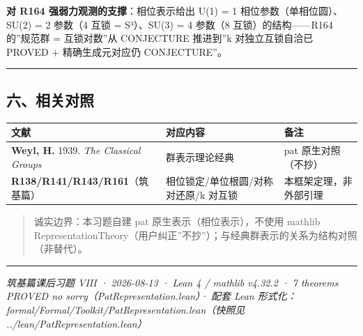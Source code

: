 \documentclass[
]{article}
\newcounter{none} %
\begin{document}
\textbf{对 R164 强弱力观测的支撑}：相位表示给出 U(1) = 1
相位参数（单相位圆）、SU(2) = 2 参数（4 互锁 = S³）、SU(3) = 4 参数（8
互锁）的结构------R164 的''规范群 = 互锁对数''从 CONJECTURE 推进到''k
对独立互锁自洽已 PROVED + 精确生成元对应仍 CONJECTURE''。

\begin{center}\rule{0.5\linewidth}{0.5pt}\end{center}

\subsection{六、相关对照}\label{ux516dux76f8ux5173ux5bf9ux7167}

{\def\LTcaptype{none} %
\begin{longtable}[]{@{}
  >{\raggedright\arraybackslash}p{}
  >{\raggedright\arraybackslash}p{}
  >{\raggedright\arraybackslash}p{}@{}}
\toprule\noalign{}
\begin{minipage}[b]{\linewidth}\raggedright
文献
\end{minipage} & \begin{minipage}[b]{\linewidth}\raggedright
对应内容
\end{minipage} & \begin{minipage}[b]{\linewidth}\raggedright
备注
\end{minipage} \\
\midrule\noalign{}
\endhead
\bottomrule\noalign{}
\endlastfoot
\textbf{Weyl, H.} 1939. \emph{The Classical Groups} & 群表示理论经典 &
pat 原生对照（不抄） \\
\textbf{R138/R141/R143/R161}（筑基篇） & 相位锁定/单位根圆/对称对还原/k
对互锁 & 本框架定理，非外部引理 \\
\end{longtable}
}

\begin{quote}
诚实边界：本习题自建 pat 原生表示（相位表示），不使用 mathlib
RepresentationTheory（用户纠正''不抄''）；与经典群表示的关系为结构对照（非替代）。
\end{quote}

\begin{center}\rule{0.5\linewidth}{0.5pt}\end{center}

\emph{筑基篇课后习题 VIII · 2026-08-13 · Lean 4 / mathlib v4.32.2 · 7
theorems PROVED no sorry（PatRepresentation.lean）· 配套 Lean
形式化：formal/Formal/Toolkit/PatRepresentation.lean（快照见
../lean/PatRepresentation.lean）}
\end{document}
